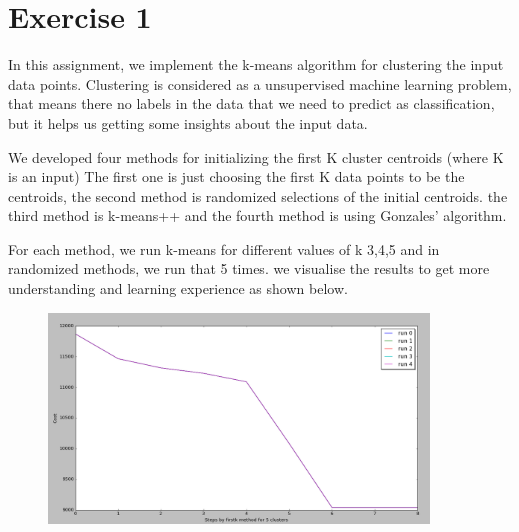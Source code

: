 \section*{Exercise 1}
In this assignment, we implement the k-means algorithm for clustering the input data points.
Clustering is considered as a unsupervised machine learning problem, that means there no labels in the data that we need to predict as classification, but it helps us getting some insights about the input data.

We developed four methods for initializing the first K cluster centroids (where K is an input)
The first one is just choosing the first K data points to be the centroids, the second method is randomized selections of the initial centroids. the third method is k-means++
and the fourth method is using Gonzales’ algorithm.

For each method, we run k-means for different values of k {3,4,5} and in randomized methods, we run that 5 times. we visualise the results to get more understanding and learning experience as shown below.



\begin{figure}[!h]
\centering
\includegraphics[width=0.9\textwidth]{shots/firstk5clusters.png}
\caption{ }
\label{barcharthover}
\end{figure}







